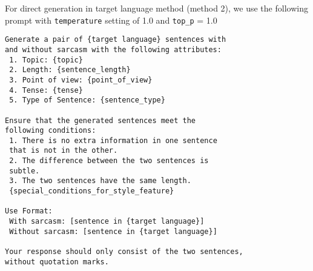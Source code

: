 For direct generation in target language method (method 2), we use the following prompt with \texttt{temperature} setting of 1.0 and \texttt{top\_p} = 1.0

\vspace{1em}
{\small
\begin{verbatim}
Generate a pair of {target language} sentences with
and without sarcasm with the following attributes:
 1. Topic: {topic}
 2. Length: {sentence_length}
 3. Point of view: {point_of_view}
 4. Tense: {tense}
 5. Type of Sentence: {sentence_type}
 
Ensure that the generated sentences meet the
following conditions:
 1. There is no extra information in one sentence
 that is not in the other. 
 2. The difference between the two sentences is 
 subtle. 
 3. The two sentences have the same length.
 {special_conditions_for_style_feature}
 
Use Format:
 With sarcasm: [sentence in {target language}]
 Without sarcasm: [sentence in {target language}]
 
Your response should only consist of the two sentences,
without quotation marks.
\end{verbatim}}
\vspace{1em}